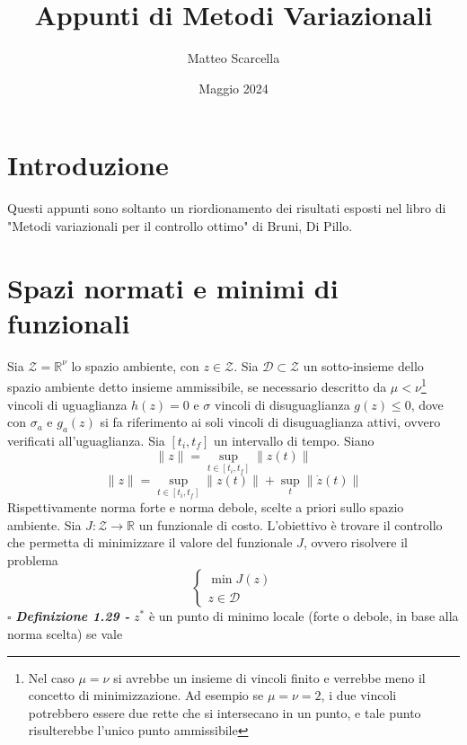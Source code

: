 \documentclass{article}
\title{Appunti di Metodi Variazionali}
\author{Matteo Scarcella}
\date{Maggio 2024}
\begin{document}
\maketitle
\tableofcontents

\newpage
\section{Introduzione}
Questi appunti sono soltanto un riordionamento dei risultati esposti nel libro di "Metodi variazionali per il controllo ottimo" di Bruni, Di Pillo. 
\section{Spazi normati e minimi di funzionali}
Sia $\mathcal{Z} = \mathbb{R}^\nu$ lo spazio ambiente, con $z \in \mathcal{Z}$. Sia $\mathcal{D} \subset \mathcal{Z}$ un sotto-insieme dello spazio ambiente detto insieme ammissibile, se necessario descritto da $\mu < \nu$\footnote{Nel caso $\mu = \nu$ si avrebbe un insieme di vincoli finito e verrebbe meno il concetto di minimizzazione. Ad esempio se $\mu = \nu = 2$, i due vincoli potrebbero essere due rette che si intersecano in un punto, e tale punto risulterebbe l'unico punto ammissibile} vincoli di uguaglianza $h(z) = 0$ e $\sigma$ vincoli di disuguaglianza $g(z) \leq 0$, dove con $\sigma_a$ e $g_a(z)$ si fa riferimento ai soli vincoli di disuguaglianza attivi, ovvero verificati all'uguaglianza. Sia $[t_i,t_f]$ un intervallo di tempo. Siano
\begin{equation}
    \|z\| = \sup_{t\in[t_i,t_f]} \|z(t)\|
\end{equation}
\begin{equation}
    \|z\| = \sup_{t\in[t_i,t_f]} \|z(t)\| + \sup_t \|\dot{z}(t)\|
\end{equation}  
Rispettivamente norma forte e norma debole, scelte a priori sullo spazio ambiente. Sia $J : \mathcal{Z} \to \mathbb{R}$ un funzionale di costo. L'obiettivo è trovare il controllo che permetta di minimizzare il valore del funzionale $J$, ovvero risolvere il problema
\begin{equation}
    \begin{cases}
        \min J(z) \\
        z \in \mathcal{D}
    \end{cases}
\end{equation}
\nobreak 
\hfill
$\square$
\newline
\textbf{\textit{Definizione 1.29 -}} $z^*$ è un punto di minimo locale (forte o debole, in base alla norma scelta) se vale
\end{document}

